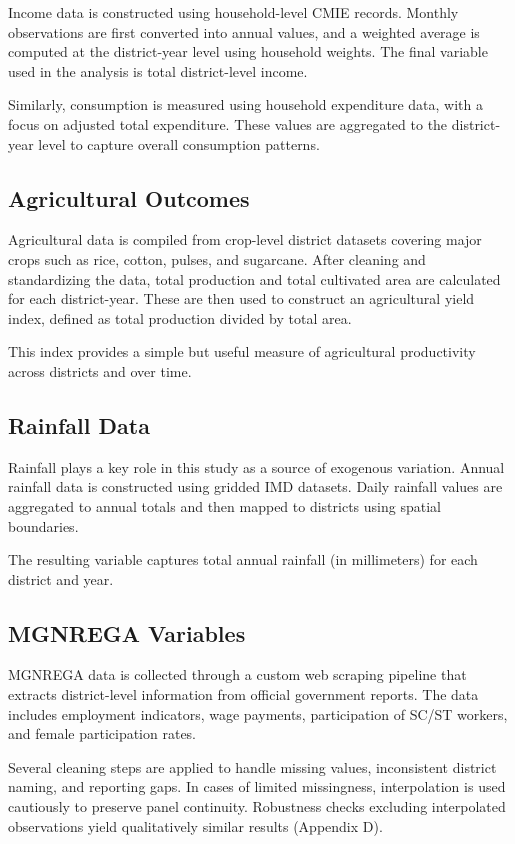 \documentclass[12pt]{article}
\begin{document}
Income data is constructed using household-level CMIE records. Monthly observations are first converted into annual values, and a weighted average is computed at the district-year level using household weights. The final variable used in the analysis is total district-level income.

Similarly, consumption is measured using household expenditure data, with a focus on adjusted total expenditure. These values are aggregated to the district-year level to capture overall consumption patterns.

\subsection{Agricultural Outcomes}

Agricultural data is compiled from crop-level district datasets covering major crops such as rice, cotton, pulses, and sugarcane. After cleaning and standardizing the data, total production and total cultivated area are calculated for each district-year. These are then used to construct an agricultural yield index, defined as total production divided by total area.

This index provides a simple but useful measure of agricultural productivity across districts and over time.

\subsection{Rainfall Data}

Rainfall plays a key role in this study as a source of exogenous variation. Annual rainfall data is constructed using gridded IMD datasets. Daily rainfall values are aggregated to annual totals and then mapped to districts using spatial boundaries.

The resulting variable captures total annual rainfall (in millimeters) for each district and year.

\subsection{MGNREGA Variables}

MGNREGA data is collected through a custom web scraping pipeline that extracts district-level information from official government reports. The data includes employment indicators, wage payments, participation of SC/ST workers, and female participation rates.

Several cleaning steps are applied to handle missing values, inconsistent district naming, and reporting gaps. In cases of limited missingness, interpolation is used cautiously to preserve panel continuity. Robustness checks excluding interpolated observations yield qualitatively similar results (Appendix D).
\end{document}
